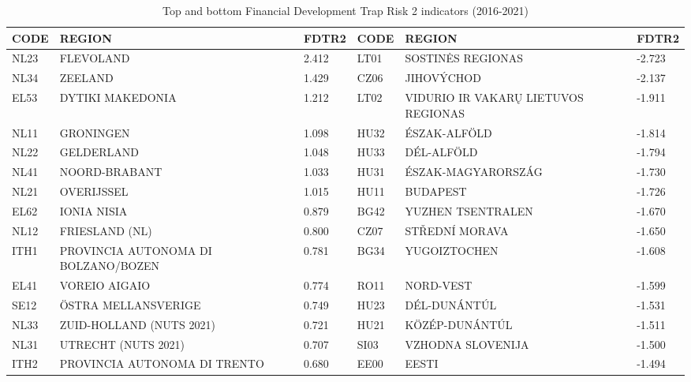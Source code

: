 \documentclass[a4paper,11pt,oneside]{article}
\begin{document}
\begin{table}
\centering
\caption{Top and bottom Financial Development Trap Risk 2 indicators (2016-2021)}
\label{tbl:top_bottom_fdtr2_2016_2021}
\footnotesize
\begin{tabular}{llllll}
\toprule
CODE & REGION                              & FDTR2 & CODE & REGION                              & FDTR2  \\
\midrule
NL23 & FLEVOLAND                           & 2.412 & LT01 & SOSTINĖS REGIONAS                   & -2.723 \\
NL34 & ZEELAND                             & 1.429 & CZ06 & JIHOVÝCHOD                          & -2.137 \\
EL53 & DYTIKI MAKEDONIA                    & 1.212 & LT02 & VIDURIO IR VAKARŲ LIETUVOS REGIONAS & -1.911 \\
NL11 & GRONINGEN                           & 1.098 & HU32 & ÉSZAK-ALFÖLD                        & -1.814 \\
NL22 & GELDERLAND                          & 1.048 & HU33 & DÉL-ALFÖLD                          & -1.794 \\
NL41 & NOORD-BRABANT                       & 1.033 & HU31 & ÉSZAK-MAGYARORSZÁG                  & -1.730 \\
NL21 & OVERIJSSEL                          & 1.015 & HU11 & BUDAPEST                            & -1.726 \\
EL62 & IONIA NISIA                         & 0.879 & BG42 & YUZHEN TSENTRALEN                   & -1.670 \\
NL12 & FRIESLAND (NL)                      & 0.800 & CZ07 & STŘEDNÍ MORAVA                      & -1.650 \\
ITH1 & PROVINCIA AUTONOMA DI BOLZANO/BOZEN & 0.781 & BG34 & YUGOIZTOCHEN                        & -1.608 \\
EL41 & VOREIO AIGAIO                       & 0.774 & RO11 & NORD-VEST                           & -1.599 \\
SE12 & ÖSTRA MELLANSVERIGE                 & 0.749 & HU23 & DÉL-DUNÁNTÚL                        & -1.531 \\
NL33 & ZUID-HOLLAND (NUTS 2021)            & 0.721 & HU21 & KÖZÉP-DUNÁNTÚL                      & -1.511 \\
NL31 & UTRECHT (NUTS 2021)                 & 0.707 & SI03 & VZHODNA SLOVENIJA                   & -1.500 \\
ITH2 & PROVINCIA AUTONOMA DI TRENTO        & 0.680 & EE00 & EESTI                               & -1.494 \\

\end{tabular}
\end{table}
\end{document}
